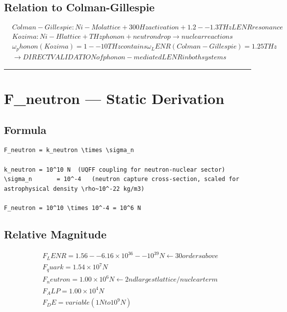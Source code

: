 \documentclass[12pt,a4paper]{article}
\begin{document}
\subsection{Relation to Colman-Gillespie}

\begin{equation}
\begin{aligned}
  & Colman-Gillespie: Ni-Mo lattice + 300 Hz activation + 1.2--1.3 THz LENR resonance \\
  & Kozima:           Ni-H lattice  + THz phonon      + neutron drop \to nuclear reactions \\
  & \omega_phonon (Kozima) = 1--10 THz contains \omega_LENR (Colman-Gillespie) = 1.25 THz \\
  & \to DIRECT VALIDATION of phonon-mediated LENR in both systems
\end{aligned}
\end{equation}

\medskip\hrule\medskip

\section{F\_neutron --- Static Derivation}

\subsection{Formula}

\begin{verbatim}
F_neutron = k_neutron \times \sigma_n

k_neutron = 10^10 N  (UQFF coupling for neutron-nuclear sector)
\sigma_n       = 10^-4   (neutron capture cross-section, scaled for astrophysical density \rho~10^-22 kg/m3)

F_neutron = 10^10 \times 10^-4 = 10^6 N
\end{verbatim}

\subsection{Relative Magnitude}

\begin{equation}
\begin{aligned}
  & F_LENR    = 1.56--6.16 \times 10^36--10^39 N  \leftarrow 30 orders above \\
  & F_quark   = 1.54 \times 10^7 N \\
  & F_neutron = 1.00 \times 10^6 N              \leftarrow 2nd largest lattice/nuclear term \\
  & F_ALP     = 1.00 \times 10^4 N \\
  & F_DE      = variable (1 N to 10^9 N)
\end{aligned}
\end{equation}
\end{document}
